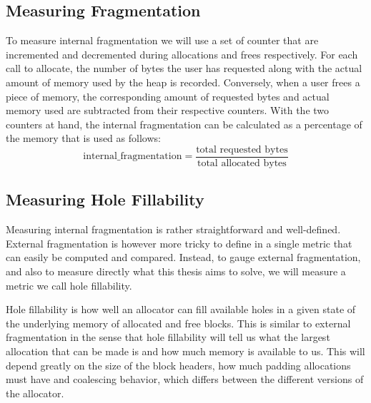 %



\subsection{Measuring Fragmentation}

To measure internal fragmentation we will use a set of counter that are incremented and decremented during allocations and frees respectively. For each call to allocate, the number of bytes the user has requested along with the actual amount of memory used by the heap is recorded. Conversely, when a user frees a piece of memory, the corresponding amount of requested bytes and actual memory used are subtracted from their respective counters. With the two counters at hand, the internal fragmentation can be calculated as a percentage of the memory that is used as follows:
\[
\text{internal\_fragmentation} = \frac{\text{total requested bytes}}{\text{total allocated bytes}}
\]
\subsection{Measuring Hole Fillability}

Measuring internal fragmentation is rather straightforward and well-defined. External fragmentation is however more tricky to define in a single metric that can easily be computed and compared. Instead, to gauge external fragmentation, and also to measure directly what this thesis aims to solve, we will measure a metric we call hole fillability.

Hole fillability is how well an allocator can fill available holes in a given state of the underlying memory of allocated and free blocks. This is similar to external fragmentation in the sense that hole fillability will tell us what the largest allocation that can be made is and how much memory is available to us. This will depend greatly on the size of the block headers, how much padding allocations must have and coalescing behavior, which differs between the different versions of the allocator.

